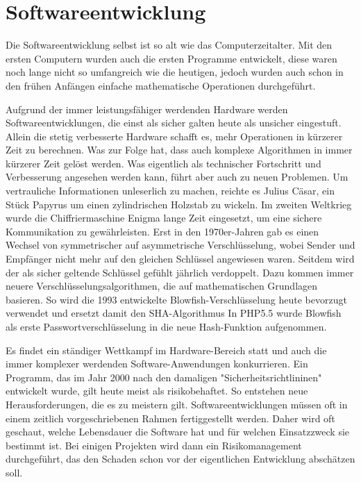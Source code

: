 \fancyhead[L]{} %
\section{Softwareentwicklung}

Die Softwareentwicklung selbst ist so alt wie das Computerzeitalter. 
Mit den ersten Computern wurden auch die ersten Programme entwickelt,
diese waren noch lange nicht so umfangreich wie die heutigen, jedoch wurden
auch schon in den frühen Anfängen einfache mathematische Operationen durchgeführt. 

Aufgrund der immer leistungsfähiger werdenden Hardware werden Softwareentwicklungen, 
die einst als sicher galten heute als unsicher eingestuft. Allein die stetig 
verbesserte Hardware schafft es, mehr Operationen in kürzerer Zeit zu berechnen.
Was zur Folge hat, dass auch komplexe Algorithmen in immer kürzerer Zeit
gelöst werden. Was eigentlich als technischer Fortschritt und Verbesserung 
angesehen werden kann, führt aber auch zu neuen Problemen.
Um vertrauliche Informationen unleserlich zu machen, reichte es Julius Cäsar, 
ein Stück Papyrus um einen zylindrischen Holzstab \cite{caesar_verschlusselung} zu wickeln. %
Im zweiten Weltkrieg wurde die Chiffriermaschine Enigma \cite{enigma_maschine} %
lange Zeit eingesetzt, um eine sichere Kommunikation zu gewährleisten. 
Erst in den 1970er-Jahren gab es einen Wechsel von symmetrischer auf 
asymmetrische Verschlüsselung, wobei Sender und Empfänger nicht mehr auf 
den gleichen Schlüssel angewiesen waren. Seitdem wird der als sicher
geltende Schlüssel gefühlt jährlich verdoppelt. Dazu kommen immer
neuere Verschlüsselungsalgorithmen, die auf mathematischen Grundlagen basieren. 
So wird die 1993 entwickelte Blowfish-Verschlüsselung \cite{schneier_blowfish} %
heute bevorzugt verwendet und ersetzt damit den SHA-Algorithmus \cite{secure_hash_standard} %
In PHP5.5 wurde Blowfish als erste Passwortverschlüsselung in die neue
Hash-Funktion aufgenommen.   

Es findet ein ständiger Wettkampf im Hardware-Bereich statt und auch die 
immer komplexer werdenden Software-Anwendungen konkurrieren. Ein Programm, 
das im Jahr 2000 nach den damaligen "Sicherheitsrichtlininen" 
entwickelt wurde, gilt heute meist als risikobehaftet. So entstehen 
neue Herausforderungen, die es zu meistern gilt. 
Softwareentwicklungen müssen oft in einem zeitlich vorgeschriebenen 
Rahmen fertiggestellt werden. Daher wird oft geschaut, welche Lebensdauer 
die Software hat und für welchen Einsatzzweck sie bestimmt ist. Bei einigen
Projekten wird dann ein Risikomanagement durchgeführt, das den 
Schaden schon vor der eigentlichen Entwicklung abschätzen soll.

